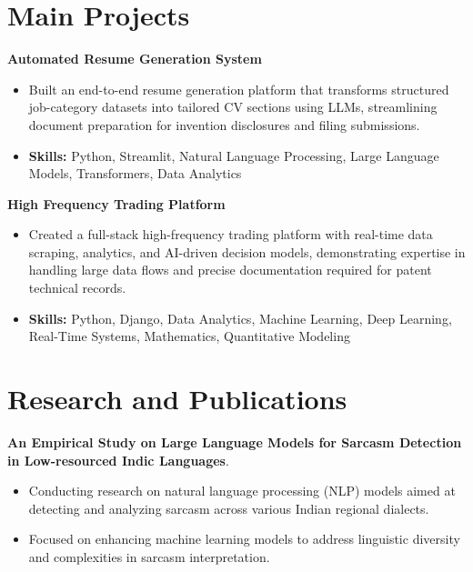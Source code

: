 \documentclass[a4paper,11pt]{article}
\begin{document}
\section{\textbf{Main Projects}}

\vspace{1mm}
  \textbf{Automated Resume Generation System  }
\vspace{-1.5mm} %
\begin{itemize}
  \item Built an end-to-end resume generation platform that transforms structured job-category datasets into tailored CV sections using LLMs, streamlining document preparation for invention disclosures and filing submissions.
\vspace{-3mm}
  \item \textbf{Skills:} Python, Streamlit, Natural Language Processing, Large Language Models, Transformers, Data Analytics
\end{itemize}


\vspace{1mm}
   \textbf{High Frequency Trading Platform }
\vspace{-1.5mm} %
\begin{itemize}
  \item Created a full-stack high-frequency trading platform with real-time data scraping, analytics, and AI-driven decision models, demonstrating expertise in handling large data flows and precise documentation required for patent technical records.
\vspace{-3mm}
  \item \textbf{Skills:} Python, Django, Data Analytics, Machine Learning, Deep Learning, Real-Time Systems, Mathematics, Quantitative Modeling
\end{itemize}



\section{\textbf{Research and Publications} \hfill }
\vspace{1mm}
  \textbf{An Empirical Study on Large Language Models for Sarcasm Detection in Low-resourced Indic Languages}.
\vspace{-1mm} %
\begin{itemize}
  \item Conducting research on natural language processing (NLP) models aimed at detecting and analyzing sarcasm across various Indian regional dialects.
\vspace{-3mm}
  \item Focused on enhancing machine learning models to address linguistic diversity and complexities in sarcasm interpretation.
\end{itemize}
\end{document}

